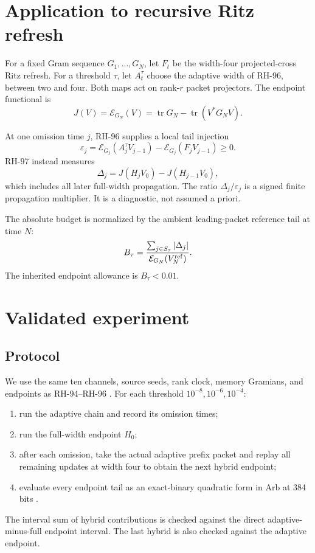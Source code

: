 \documentclass[11pt]{article}
\theoremstyle{definition}
\theoremstyle{remark}
\newcommand{\tr}{\operatorname{tr}}
\begin{document}
\section{Application to recursive Ritz refresh}
\label{sec:ritz}

For a fixed Gram sequence $G_1,\ldots,G_N$, let $F_t$ be the width-four
projected-cross Ritz refresh.  For a threshold $\tau$, let $A_t^\tau$ choose
the adaptive width of RH-96, between two and four.  Both maps act on
rank-$r$ packet projectors.  The endpoint functional is
\[
 J(V)=\mathcal E_{G_N}(V)
 =\tr G_N-\tr(V^*G_NV).
\]

At one omission time $j$, RH-96 supplies a local tail injection
\[
 \varepsilon_j
 =\mathcal E_{G_j}(A_j^\tau V_{j-1})
 -\mathcal E_{G_j}(F_jV_{j-1})\ge0.
\]
RH-97 instead measures
\[
 \Delta_j
 =J(H_jV_0)-J(H_{j-1}V_0),
\]
which includes all later full-width propagation.  The ratio
$\Delta_j/\varepsilon_j$ is a signed finite propagation multiplier.  It is a
diagnostic, not assumed a priori.

The absolute budget is normalized by the ambient leading-packet reference
tail at time $N$:
\begin{equation}
 B_\tau
 =\frac{\sum_{j\in S_\tau}|\Delta_j|}
 {\mathcal E_{G_N}(V_N^{\rm ref})}.
 \label{eq:budget}
\end{equation}
The inherited endpoint allowance is $B_\tau<0.01$.

\section{Validated experiment}
\label{sec:audit}

\subsection{Protocol}

We use the same ten channels, source seeds, rank clock, memory Gramians, and
endpoints as RH-94--RH-96 \citep{WangSourceSeed2026}.  For each threshold
$10^{-8},10^{-6},10^{-4}$:
\begin{enumerate}[leftmargin=2em]
\item run the adaptive chain and record its omission times;
\item run the full-width endpoint $H_0$;
\item after each omission, take the actual adaptive prefix packet and replay
all remaining updates at width four to obtain the next hybrid endpoint;
\item evaluate every endpoint tail as an exact-binary quadratic form in Arb at
384 bits \citep{Rump2010}.
\end{enumerate}
The interval sum of hybrid contributions is checked against the direct
adaptive-minus-full endpoint interval.  The last hybrid is also checked
against the adaptive endpoint.
\end{document}
